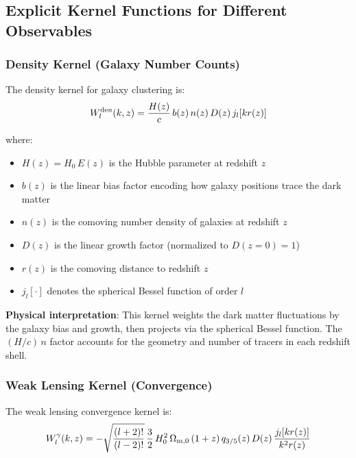 \subsection{Explicit Kernel Functions for Different Observables}

\subsubsection{Density Kernel (Galaxy Number Counts)}

The density kernel for galaxy clustering is:
\begin{equation}
\label{eq:kernel_den}
W^{\rm den}_l(k, z) = \frac{H(z)}{c} \, b(z) \, n(z) \, D(z) \, j_l[k r(z)]
\end{equation}

where:
\begin{itemize}
  \item $H(z) = H_0 \, E(z)$ is the Hubble parameter at redshift $z$
  \item $b(z)$ is the linear bias factor encoding how galaxy positions trace the dark matter
  \item $n(z)$ is the comoving number density of galaxies at redshift $z$
  \item $D(z)$ is the linear growth factor (normalized to $D(z=0) = 1$)
  \item $r(z)$ is the comoving distance to redshift $z$
  \item $j_l[\cdot]$ denotes the spherical Bessel function of order $l$
\end{itemize}

\textbf{Physical interpretation}: This kernel weights the dark matter fluctuations by the galaxy bias and growth, then projects via the spherical Bessel function. The $(H/c) \, n$ factor accounts for the geometry and number of tracers in each redshift shell.

\subsubsection{Weak Lensing Kernel (Convergence)}

The weak lensing convergence kernel is:
\begin{equation}
\label{eq:kernel_gamma}
W^\gamma_l(k, z) = -\sqrt{\frac{(l+2)!}{(l-2)!}} \, \frac{3}{2} \, H_0^2 \, \Omega_{{\rm m},0} \, (1+z) \, q_{3/5}(z) \, D(z) \, \frac{j_l[k r(z)]}{k^2 r(z)}
\end{equation}

